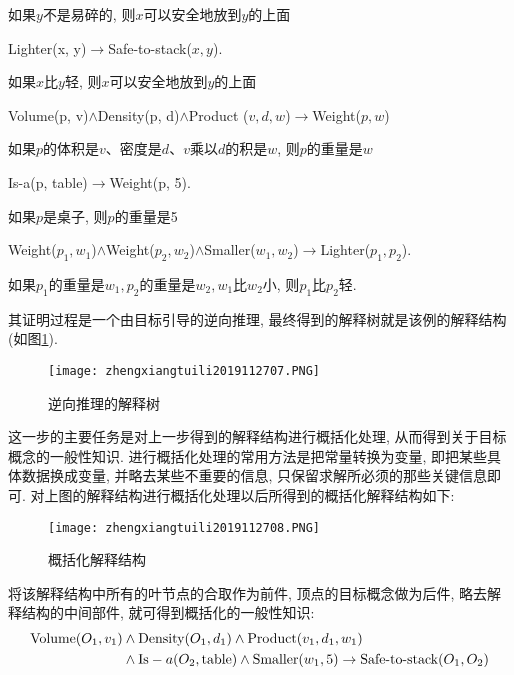 如果$y$不是易碎的, 则$x$可以安全地放到$y$的上面
\begin{center}
    Lighter(x, y)$\rightarrow$Safe-to-stack($x, y$).
\end{center}

如果$x$比$y$轻, 则$x$可以安全地放到$y$的上面
\begin{center}
  Volume(p, v)$\wedge$Density(p, d)$\wedge$Product ($v, d, w$)$\rightarrow$Weight($p, w$)
\end{center}

如果$p$的体积是$v$、密度是$d$、$v$乘以$d$的积是$w$, 则$p$的重量是$w$
\begin{center}
    Is-a(p, table)$\rightarrow$Weight(p, 5).
\end{center}

如果$p$是桌子, 则$p$的重量是5
\begin{center}
  Weight($p_1, w_1$)$\wedge$Weight($p_2,w_2$)$\wedge$Smaller($w_1, w_2$)$\rightarrow$Lighter($p_1, p_2$).
\end{center}

如果$p_1$的重量是$w_1, p_2$的重量是$w_2,w_1$比$w_2$小,  则$p_1$比$p_2$轻.

其证明过程是一个由目标引导的逆向推理, 最终得到的解释树就是该例的解释结构(如图\ref{AI32fig2707}).
\begin{figure}[H]
\centering
\texttt{[image: zhengxiangtuili2019112707.PNG]}
\caption{逆向推理的解释树}
\label{AI32fig2707}
\end{figure}

这一步的主要任务是对上一步得到的解释结构进行概括化处理, 从而得到关于目标概念的一般性知识.
     进行概括化处理的常用方法是把常量转换为变量, 即把某些具体数据换成变量, 并略去某些不重要的信息, 只保留求解所必须的那些关键信息即可.
     对上图的解释结构进行概括化处理以后所得到的概括化解释结构如下:
\begin{figure}[H]
\centering
\texttt{[image: zhengxiangtuili2019112708.PNG]}
\caption{概括化解释结构}
\label{AI32fig2708}
\end{figure}
 将该解释结构中所有的叶节点的合取作为前件, 顶点的目标概念做为后件, 略去解释结构的中间部件, 就可得到概括化的一般性知识:
\begin{align}
  \textup{Volume}(O_1,v_1)&\wedge \textup{Density}(O_1,d_1)\wedge \textup{Product}(v_1,d_1,w_1)\notag\\
                          &\wedge \textup{Is}-a(O_2,\textup{table})\wedge\textup{Smaller}(w_1,5)\rightarrow \textup{Safe-to-stack}(O_1,O_2)
\end{align}
